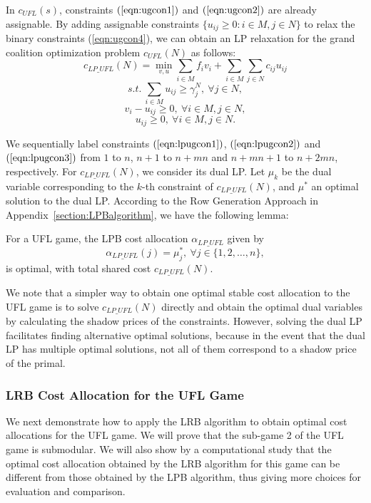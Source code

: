 \documentclass[ijoc,nonblindrev]{informs3} %
\begin{document}
In $c_{UFL}(s)$, constraints $(\ref{eqn:ugcon1})$ and  $(\ref{eqn:ugcon2})$ are already assignable. By adding assignable constraints $\{u_{ij} \geq 0:i \in M, j \in N\}$ to relax the binary constraints (\ref{eqn:ugcon4}), we can obtain an LP relaxation for the grand coalition optimization problem $c_{UFL}(N)$ as follows:
\begin{equation*}\label{eqn:lpugobj}
c_{LP\_UFL}(N) = \min_{v,u} \sum_{i \in M} f_iv_i + \sum_{i \in M} \sum_{j \in N} c_{ij}u_{ij}
\end{equation*}
\begin{equation} \label{eqn:lpugcon1}
s.t.~\sum_{i \in M} u_{ij} \geq \gamma_j^N, ~\forall j \in N,
\end{equation}
\begin{equation}\label{eqn:lpugcon2}
v_i - u_{ij} \geq 0, ~\forall i \in M, j \in N,
\end{equation}
\begin{equation}\label{eqn:lpugcon3}
u_{ij} \geq 0, ~\forall i \in M, j \in N.
\end{equation}

We sequentially label constraints $(\ref{eqn:lpugcon1})$, $(\ref{eqn:lpugcon2})$ and $(\ref{eqn:lpugcon3})$ from $1$ to $n$, $n+1$ to $n+mn$ and $n+mn+1$ to $n+2mn$, respectively.
For $c_{LP\_UFL}(N)$, we consider its dual LP. Let $\mu_k$  be the dual variable corresponding to the $k$-th constraint of $c_{LP\_UFL}(N)$, and $\mu^*$ an optimal solution to the dual LP.
According to the Row Generation Approach in Appendix~\ref{section:LPBalgorithm}, we have the following lemma:
\begin{lemma}\label{lemma:lpbcaufl}
For a UFL game, the LPB cost allocation $\alpha_{LP\_UFL}$ given by
\begin{equation*}
\alpha_{LP\_UFL}(j) = \mu_j^*, ~\forall j \in \big\{1,2,\ldots,n\big\},
\end{equation*}
is optimal, with total shared cost $c_{LP\_UFL}(N)$.
\end{lemma}


We note that a simpler way to obtain one optimal stable cost allocation to the UFL game is to solve $c_{LP\_UFL}(N)$ directly and obtain the optimal dual variables by calculating the shadow prices of the constraints.  
However, solving the dual LP facilitates finding alternative optimal solutions, because in the event that the dual LP has multiple optimal solutions, not all of them correspond to a shadow price of the primal.


\subsubsection{LRB Cost Allocation for the UFL Game}\label{section:UFLLRB}
We next demonstrate how to apply the LRB algorithm to obtain optimal cost allocations for the UFL game. We will prove that the sub-game 2 of the UFL game is submodular. We will also show by a computational study that the optimal cost allocation obtained by the LRB algorithm for this game can be different from those obtained by the LPB algorithm, thus giving more choices for evaluation and comparison.
\end{document}
